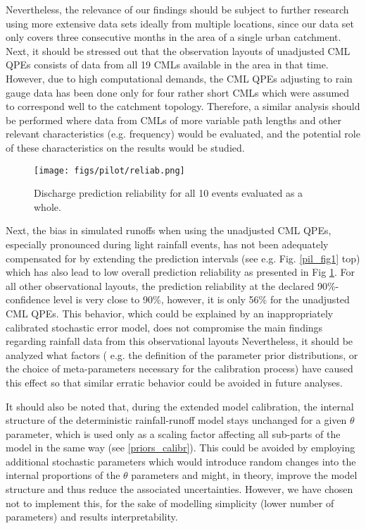 \documentclass{ctuthesis}\usepackage[]{graphicx}\usepackage[]{color}
\begin{document}
Nevertheless, the relevance of our findings should be subject to further research using more extensive data sets ideally from multiple locations, since our data set only covers three consecutive months in the area of a single urban catchment. Next, it should be stressed out that the observation layouts of unadjusted CML QPEs consists of data from all 19 CMLs available in the area in that time. However, due to high computational demands, the CML QPEs adjusting to rain gauge data has been done only for four rather short CMLs which were assumed to correspond well to the catchment topology. Therefore, a similar analysis should be performed where data from CMLs of more variable path lengths and other relevant characteristics (e.g. frequency) would be evaluated, and the potential role of these characteristics on the results would be studied.

\begin{figure}[H]
\begin{center}
\texttt{[image: figs/pilot/reliab.png]}
\caption{Discharge prediction reliability for all 10 events evaluated as a whole.} \label{pil_fig4}
\end{center}
\end{figure}

Next, the bias in simulated runoffs when using the unadjusted CML QPEs, especially pronounced during light rainfall events, has not been adequately compensated for by extending the prediction intervals (see e.g. Fig. \ref{pil_fig1} top) which has also lead to low overall prediction reliability as presented in Fig \ref{pil_fig4}. For all other observational layouts, the prediction reliability at the declared 90\%-confidence level is very close to 90\%, however, it is only 56\% for the unadjusted CML QPEs. This behavior, which could be explained by an inappropriately calibrated stochastic error model, does not compromise the main findings regarding rainfall data from this observational layouts Nevertheless, it should be analyzed what factors ( e.g. the definition of the parameter prior distributions, or the choice of meta-parameters necessary for the calibration process) have caused this effect so that similar erratic behavior could be avoided in future analyses.  

It should also be noted that, during the extended model calibration, the internal structure of the deterministic rainfall-runoff model stays unchanged for a given $\theta$ parameter, which is used only as a scaling factor affecting all sub-parts of the model in the same way (see \ref{priors_calibr}). This could be avoided by employing additional stochastic parameters which would introduce random changes into the internal proportions of the $\theta$ parameters and might, in theory, improve the model structure and thus reduce the associated uncertainties. However, we have chosen not to implement this, for the sake of modelling simplicity (lower number of parameters) and results interpretability.
\end{document}
